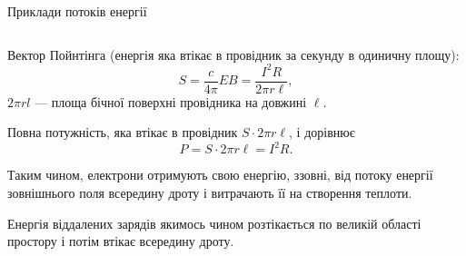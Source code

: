 \documentclass{beamer}
\begin{document}
\begin{frame}[t]{Приклади потоків енергії}{}
\begin{columns}
\begin{column}{0.7\linewidth}
\begin{overprint}
				Вектор Пойнтінга (енергія яка втікає в провідник за секунду в одиничну площу):
				\begin{equation*}
					S = \frac{c}{4\pi} E B = \frac{I^2R}{2\pi r \ell},
				\end{equation*}
				$ 2\pi r l $ --- площа бічної поверхні провідника на довжині $ \ell $.

				Повна потужність, яка втікає в провідник $ S\cdot 2\pi r \ell $, і дорівнює
				\begin{equation*}
					P = S\cdot 2\pi r \ell = I^2 R.
				\end{equation*}
				\onslide<2>
				\begin{block}\justifying\small
					Таким чином, електрони отримують свою енергію, ззовні, від потоку енергії зовнішнього поля всередину дроту і витрачають її на створення теплоти.

					\bigskip

					Енергія віддалених зарядів якимось чином розтікається по великій області простору і потім втікає всередину дроту.
				\end{block}
			\end{overprint}
		\end{column}
	\end{columns}

\end{frame}
\end{document}
